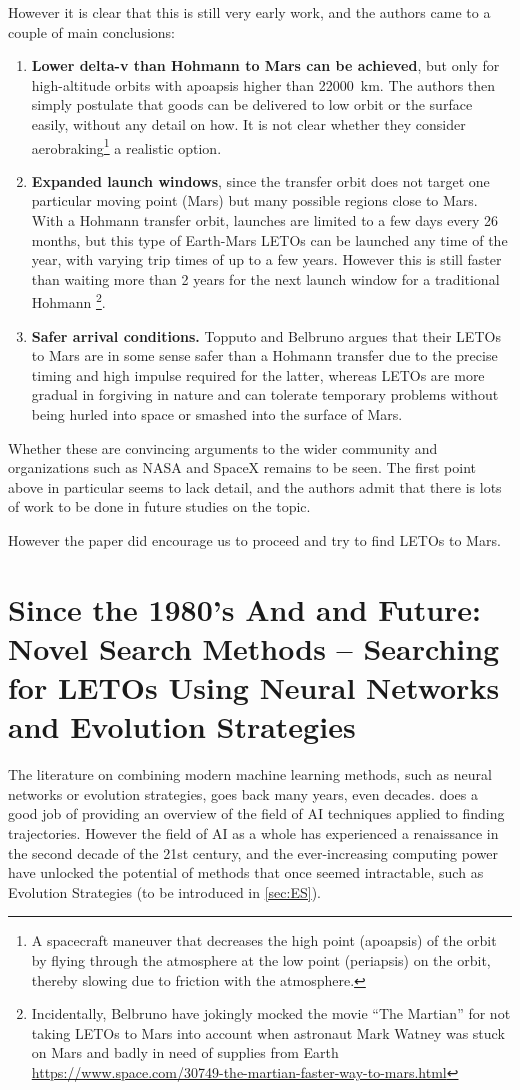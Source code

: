 However it is clear that this is still very early work, and the authors came to a couple of main conclusions:
\begin{enumerate}
	\item \textbf{Lower delta-v than Hohmann to Mars can be achieved}, but only for high-altitude orbits with apoapsis higher than \SI{22000}{\km}. The authors then simply postulate that goods can be delivered to low orbit or the surface easily, without any detail on how. It is not clear whether they consider aerobraking\footnote{A spacecraft maneuver that decreases the high point (apoapsis) of the orbit by flying through the atmosphere at the low point (periapsis) on the orbit, thereby slowing due to friction with the atmosphere.} a realistic option.
	\item \textbf{Expanded launch windows}, since the transfer orbit does not target one particular moving point (Mars) but many possible regions close to Mars. With a Hohmann transfer orbit, launches are limited to a few days every 26 months, but this type of Earth-Mars LETOs can be launched any time of the year, with varying trip times of up to a few years. However this is still faster than waiting more than 2 years for the next launch window for a traditional Hohmann \footnote{Incidentally, Belbruno have jokingly mocked the  movie ``The Martian'' for not taking LETOs to Mars into account when astronaut Mark Watney was stuck on Mars and badly in need of supplies from Earth \url{https://www.space.com/30749-the-martian-faster-way-to-mars.html}}.
	\item \textbf{Safer arrival conditions.} Topputo and Belbruno argues that their LETOs to Mars are in some sense safer than a Hohmann transfer due to the precise timing and high impulse required for the latter, whereas LETOs are more gradual in forgiving in nature and can tolerate temporary problems without being hurled into space or smashed into the surface of Mars.
\end{enumerate}
Whether these are convincing arguments to the wider community and organizations such as NASA and SpaceX remains to be seen. The first point above in particular seems to lack detail, and the authors admit that there is lots of work to be done in future studies on the topic.

However the paper did encourage us to proceed and try to find LETOs to Mars.

\section{Since the 1980's And  and Future: Novel Search Methods – Searching for LETOs Using Neural Networks and Evolution Strategies}
The literature on combining modern machine learning methods, such as neural networks or evolution strategies, goes back many years, even decades. \cite{Izzo2018} does a good job of providing an overview of the field of AI techniques applied to finding trajectories. However the field of AI as a whole has experienced a renaissance in the second decade of the 21st century, and the ever-increasing computing power have unlocked the potential of methods that once seemed intractable, such as Evolution Strategies \cite{Salimans2017} (to be introduced in \cref{sec:ES}).

